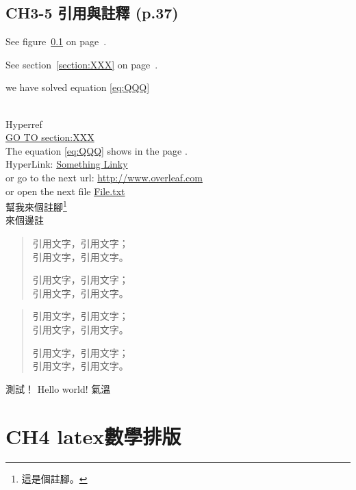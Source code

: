 \documentclass[12pt]{article}
\begin{document}
\begin{CJK*}{UTF8}{bkai}
	\newpage

	\subsection{CH3-5 引用與註釋 (p.37)}




	\label{figure:test}	
	See figure~\ref{figure:test} on page~\pageref{figure:test}.
	
	\label{section:XXX}
	See section~\ref{section:XXX} on page~\pageref{section:XXX}.

	we have solved equation \eqref{eq:QQQ} %
	
	
	\mbox{}\\
	{\Large Hyperref} \\	
	\hyperref[section:XXX]{GO TO section:XXX}\\
	The equation \ref{eq:QQQ} shows in the page \pageref{eq:QQQ}.\\	
	HyperLink:  \href{http://www.overleaf.com}{Something Linky}\\
	 or go to the next url: \url{http://www.overleaf.com}\\
	 or open the next file \href{run:./file.txt}{File.txt}\\
	 
	幫我來個註腳\footnote{這是個註腳。}\\
	
	來個邊註\\

	\begin{quote}
		引用文字，引用文字；\\
		引用文字，引用文字。
		
		引用文字，引用文字；\\
		引用文字，引用文字。
	\end{quote}
	
	\begin{quotation}
		引用文字，引用文字；\\
		引用文字，引用文字。
		
		引用文字，引用文字；\\
		引用文字，引用文字。
	\end{quotation}


	
	
	測試！ Hello world! 氣溫
	\newpage
	\section{CH4 latex數學排版}
	

\end{CJK*}
\end{document}
